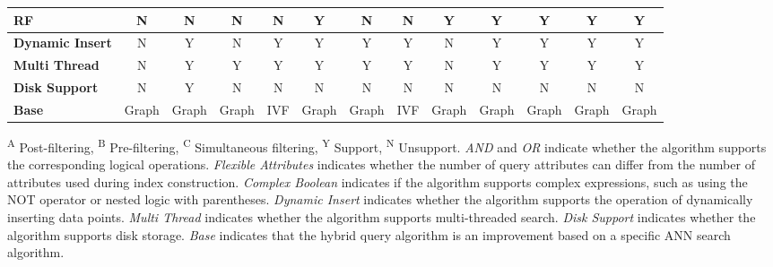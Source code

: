 \documentclass[sigconf, nonacm]{acmart}
\begin{document}
\begin{table}[t]
\begin{tabular}{|l|l|*{12}{c|}}
		\multicolumn{2}{|l|}{\textbf{RF}}             & N & N & N & N & Y & N & N & Y & Y & Y & Y & Y \\ \hline
		\multicolumn{2}{|l|}{\textbf{Dynamic Insert}} & N & Y & N & Y & Y & Y & Y & N & Y & Y & Y & Y \\ \hline
		\multicolumn{2}{|l|}{\textbf{Multi Thread}}   & N & Y & Y & Y & Y & Y & Y & N & Y & Y & Y & Y \\ \hline
		\multicolumn{2}{|l|}{\textbf{Disk Support}}           &N  & Y& N & N & N & N & N & N & N & N & N & N \\ \hline
		\multicolumn{2}{|l|}{\textbf{Base}}           & Graph & Graph & Graph & IVF & Graph & Graph & IVF & Graph & Graph & Graph & Graph & Graph \\ \hline
	\end{tabular}
		
%		
		
		
		\centering
		\footnotesize{
			\begin{minipage}{\linewidth}
				\vspace{0.1cm}
				\textsuperscript{A} Post-filtering, 
				\textsuperscript{B} Pre-filtering, 
				\textsuperscript{C} Simultaneous filtering, 
				\textsuperscript{Y} Support, 
				\textsuperscript{N} Unsupport. 
				\textit{AND} and \textit{OR} indicate whether the algorithm supports the corresponding logical operations.
				\textit{Flexible Attributes} indicates whether the number of query attributes can differ from the number of attributes used during index construction. 
				\textit{Complex Boolean} indicates if the algorithm supports complex expressions, such as using the NOT operator or nested logic with parentheses.
				\textit{Dynamic Insert} indicates whether the algorithm supports the operation of dynamically inserting data points.
				\textit{Multi Thread} indicates whether the algorithm supports multi-threaded search.
				\textit{Disk Support} indicates whether the algorithm supports disk storage.
				\textit{Base} indicates that the hybrid query algorithm is an improvement based on a specific ANN search algorithm.
		\end{minipage}}
		
	\end{table}
	
\end{document}
